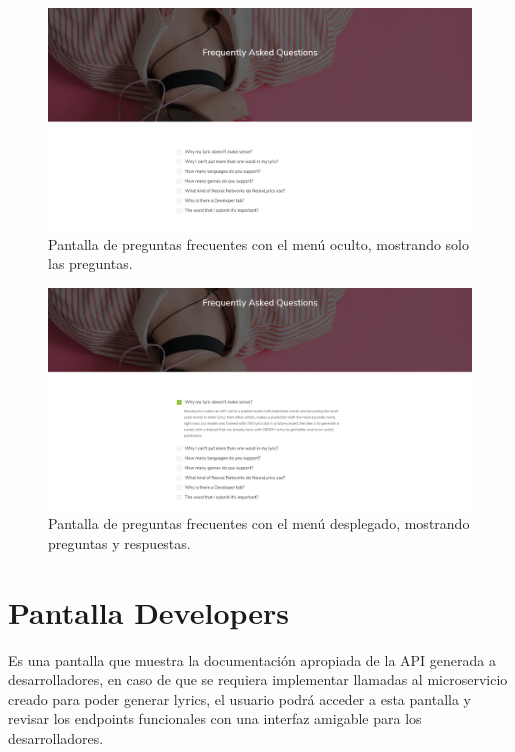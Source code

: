 \documentclass[12pt, a4paper, titlepage]{article}
\begin{document}
		\begin{figure}[H] 
			\includegraphics[width=13.5cm]{./Imagenes/Capturas/pfaqclose.png}
			\centering \caption{Pantalla de preguntas frecuentes con el menú oculto, mostrando solo las preguntas.}
		\end{figure}
	
		\begin{figure}[H] 
		\includegraphics[width=13.5cm]{./Imagenes/Capturas/pfaqopen.png}
		\centering \caption{Pantalla de preguntas frecuentes con el menú desplegado, mostrando preguntas y respuestas.}
		\end{figure}
	
		\section{Pantalla Developers}
		Es una pantalla que muestra la documentación apropiada de la API generada a desarrolladores, en caso de que se requiera implementar llamadas al microservicio creado para poder generar lyrics, el usuario podrá acceder a esta pantalla y revisar los endpoints funcionales con una interfaz amigable para los desarrolladores.
		
\end{document}
